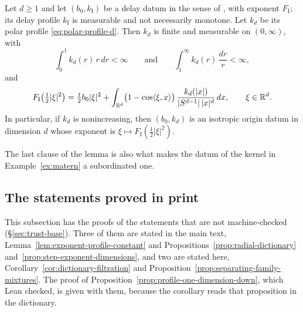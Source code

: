 \begin{lemma}\label{lem:delay-polar-profile}
Let $d \ge 1$ and let $(b_0, k_{\mathrm I})$ be a delay datum in the sense of ,
with exponent $F_{\mathrm I}$; its delay profile $k_{\mathrm I}$ is measurable and not necessarily
monotone. Let $k_d$ be its polar profile \ref{eq:polar-profile-d}. Then $k_d$ is finite and measurable on
$(0,\infty)$, with
\[
  \int_0^1 k_d(r)\,r\,dr < \infty
  \qquad\text{and}\qquad
  \int_1^\infty k_d(r)\,\frac{dr}{r} < \infty ,
\]
and
\[
  F_{\mathrm I}\bigl(\tfrac12|\xi|^2\bigr) = \tfrac12 b_0|\xi|^2
   + \int_{\mathbb{R}^d}\bigl(1 - \cos\langle\xi,x\rangle\bigr)\,\frac{k_d(|x|)}{|S^{d-1}|\,|x|^d}\,dx ,
   \qquad \xi \in \mathbb{R}^d .
\]
In particular, if $k_d$ is nonincreasing, then $(b_0,k_d)$ is an isotropic origin datum in
dimension $d$ whose exponent is $\xi \mapsto F_{\mathrm I}(\tfrac12|\xi|^2)$.
\end{lemma}

The last clause of the lemma is also what makes the datum of the \Matern{} kernel in
Example~\ref{ex:matern} a subordinated one.

\subsection{The statements proved in print}\label{app:print-proofs}

This subsection has the proofs of the statements that are not machine-checked
(\S\ref{sec:trust-base}). Three of them are stated in the main text,
Lemma~\ref{lem:exponent-profile-constant} and Propositions~\ref{prop:radial-dictionary}
and~\ref{prop:step-exponent-dimensions}, and two are stated here,
Corollary~\ref{cor:dictionary-filtration} and
Proposition~\ref{prop:separating-family-mixtures}. The proof of
Proposition~\ref{prop:profile-one-dimension-down}, which Lean checked, is given with them,
because the corollary reads that proposition in the dictionary.

